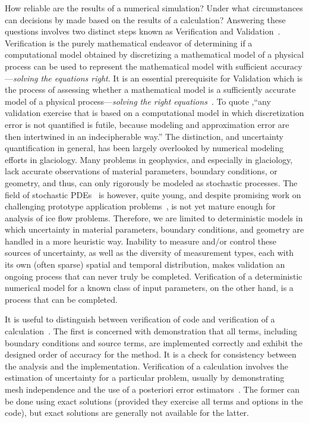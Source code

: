 How reliable are the results of a numerical simulation?
Under what circumstances can decisions by made based on the results of a calculation?
Answering these questions involves two distinct steps known as Verification and Validation~\citep{babuska2004vav,roache1998verification}.
Verification is the purely mathematical endeavor of determining if a computational model obtained by discretizing a mathematical model of a physical process can be used to represent the mathematical model with sufficient accuracy---\emph{solving the equations right}.
It is an essential prerequisite for Validation which is the process of assessing whether a mathematical model is a sufficiently accurate model of a physical process---\emph{solving the right equations}~\citep{roache1998verification}.
To quote \citet{babuska2004vav},``any validation exercise that is based on a computational model in which discretization error is not quantified is futile, because modeling and approximation error are then intertwined in an indecipherable way.''
The distinction, and uncertainty quantification in general, has been largely overlooked by numerical modeling efforts in glaciology.
Many problems in geophysics, and especially in glaciology, lack accurate observations of material parameters, boundary conditions, or geometry, and thus, can only rigorously be modeled as stochastic processes.
The field of stochastic PDEs~\citep{deb2001ssp,ghanem2003sfe,chow2007stochastic} is however, quite young, and despite promising work on challenging prototype application problems~\citep{asokan2006stochastic,ganapathysubramanian2007sgc,zabaras2008scalable,mishra2011mlmcfvm}, is not yet mature enough for analysis of ice flow problems.
Therefore, we are limited to deterministic models in which uncertainty in material parameters, boundary conditions, and geometry are handled in a more heuristic way.
Inability to measure and/or control these sources of uncertainty, as well as the diversity of measurement types, each with its own (often sparse) spatial and temporal distribution, makes validation an ongoing process that can never truly be completed.
Verification of a deterministic numerical model for a known class of input parameters, on the other hand, is a process that can be completed.

It is useful to distinguish between verification of code and verification of a calculation~\citep{roache2002cvm}.
The first is concerned with demonstration that all terms, including boundary conditions and source terms, are implemented correctly and exhibit the designed order of accuracy for the method.
It is a check for consistency between the analysis and the implementation.
Verification of a calculation involves the estimation of uncertainty for a particular problem, usually by demonstrating mesh independence and the use of a posteriori error estimators~\citep{ainsworth1997pee}.
The former can be done using exact solutions (provided they exercise all terms and options in the code), but exact solutions are generally not available for the latter.

